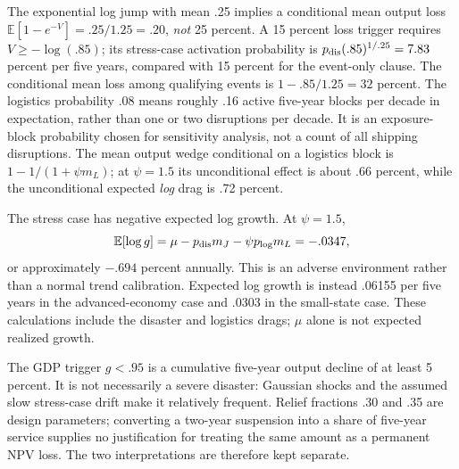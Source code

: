 \documentclass[11pt]{article}
\newcommand{\E}{\mathbb E}
\begin{document}
The exponential log jump with mean .25 implies a conditional mean output loss $\E[1-e^{-V}]=.25/1.25=.20$, \emph{not} 25 percent. A 15 percent loss trigger requires $V\ge-\log(.85)$; its stress-case activation probability is $p_{\rm dis}(.85)^{1/.25}=7.83$ percent per five years, compared with 15 percent for the event-only clause. The conditional mean loss among qualifying events is $1-.85/1.25=32$ percent. The logistics probability .08 means roughly .16 active five-year blocks per decade in expectation, rather than one or two disruptions per decade. It is an exposure-block probability chosen for sensitivity analysis, not a count of all shipping disruptions. The mean output wedge conditional on a logistics block is $1-1/(1+\psi m_L)$; at $\psi=1.5$ its unconditional effect is about .66 percent, while the unconditional expected \emph{log} drag is .72 percent.

The stress case has negative expected log growth. At $\psi=1.5$,
\begin{equation}\label{eq:meanlog}
 \E[\log g]=\mu-p_{\rm dis}m_J-\psi p_{\log}m_L
 =-.0347,
\end{equation}
or approximately $-.694$ percent annually. This is an adverse environment rather than a normal trend calibration. Expected log growth is instead .06155 per five years in the advanced-economy case and .0303 in the small-state case. These calculations include the disaster and logistics drags; $\mu$ alone is not expected realized growth.

The GDP trigger $g<.95$ is a cumulative five-year output decline of at least 5 percent. It is not necessarily a severe disaster: Gaussian shocks and the assumed slow stress-case drift make it relatively frequent. Relief fractions .30 and .35 are design parameters; converting a two-year suspension into a share of five-year service supplies no justification for treating the same amount as a permanent NPV loss. The two interpretations are therefore kept separate.
\end{document}
